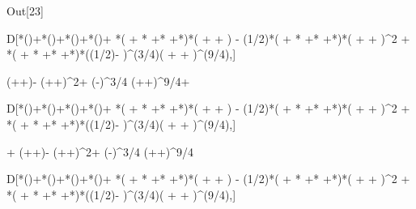 Out[23]

D[*\log ()+*\log ()+*\log ()+*\log ()+ *( + * +* +*)*( +  + ) - (1/2)*( + * +* +*)*( +  + ){}^{\wedge}2 + *( + * +* +*)*((1/2)- ){}^{\wedge}(3/4)( +  + ){}^{\wedge}(9/4),]

 (++)- (++){}^2+ \left(-\right)^{3/4} (++){}^{9/4}+\log  {}

D[*\log ()+*\log ()+*\log ()+*\log ()+ *( + * +* +*)*( +  + ) - (1/2)*( + * +* +*)*( +  + ){}^{\wedge}2 + *( + * +* +*)*((1/2)- ){}^{\wedge}(3/4)( +  + ){}^{\wedge}(9/4),]

\log  {}+  (++)-  (++){}^2+ \left(-\right)^{3/4}  (++){}^{9/4}

D[*\log ()+*\log ()+*\log ()+*\log ()+ *( + * +* +*)*( +  + ) - (1/2)*( + * +* +*)*( +  + ){}^{\wedge}2 + *( + * +* +*)*((1/2)- ){}^{\wedge}(3/4)( +  + ){}^{\wedge}(9/4),]

